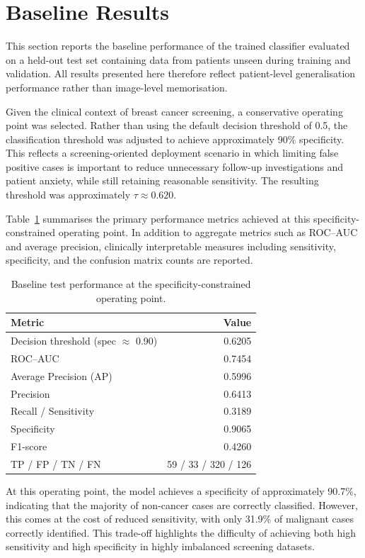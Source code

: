 \section{Baseline Results}

This section reports the baseline performance of the trained classifier evaluated on a held-out test set
containing data from patients unseen during training and validation. All results presented here therefore
reflect patient-level generalisation performance rather than image-level memorisation.

Given the clinical context of breast cancer screening, a conservative operating point was selected.
Rather than using the default decision threshold of 0.5, the classification threshold was adjusted to
achieve approximately 90\% specificity. This reflects a screening-oriented deployment scenario in which
limiting false positive cases is important to reduce unnecessary follow-up investigations and patient
anxiety, while still retaining reasonable sensitivity. The resulting threshold was approximately
$\tau \approx 0.620$.

Table~\ref{tab:baseline_metrics} summarises the primary performance metrics achieved at this
specificity-constrained operating point. In addition to aggregate metrics such as ROC--AUC and average
precision, clinically interpretable measures including sensitivity, specificity, and the confusion matrix
counts are reported.

\begin{table}[H]
\centering
\begin{tabular}{lr}
\toprule
Metric & Value \\
\midrule
Decision threshold (spec $\approx$ 0.90) & 0.6205 \\
ROC--AUC & 0.7454 \\
Average Precision (AP) & 0.5996 \\
Precision & 0.6413 \\
Recall / Sensitivity & 0.3189 \\
Specificity & 0.9065 \\
F1-score & 0.4260 \\
\midrule
TP / FP / TN / FN & 59 / 33 / 320 / 126 \\
\bottomrule
\end{tabular}
\caption{Baseline test performance at the specificity-constrained operating point.}
\label{tab:baseline_metrics}
\end{table}

At this operating point, the model achieves a specificity of approximately 90.7\%, indicating that the
majority of non-cancer cases are correctly classified. However, this comes at the cost of reduced
sensitivity, with only 31.9\% of malignant cases correctly identified. This trade-off highlights the
difficulty of achieving both high sensitivity and high specificity in highly imbalanced screening datasets.

